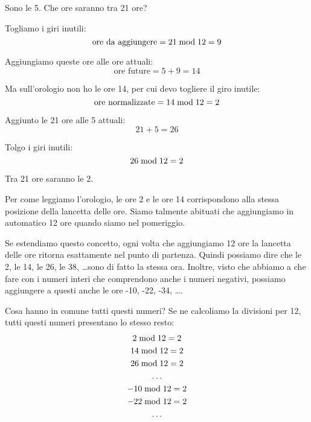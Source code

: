 \begin{esercizio}
    Sono le 5.
    Che ore saranno tra 21 ore?


    Togliamo i giri inutili:
    \begin{equation*}
        \text{ore da aggiungere} = 21  \bmod  12 = 9
    \end{equation*}

    Aggiungiamo queste ore alle ore attuali:
    \begin{equation*}
        \text{ore future} = 5 + 9 = 14
    \end{equation*}

    Ma sull'orologio non ho le ore 14, per cui devo togliere il giro inutile:
    \begin{equation*}
        \text{ore normalizzate} = 14  \bmod  12 = 2
    \end{equation*}


    Aggiunto le 21 ore alle 5 attuali:
    \begin{equation*}
        21 + 5 = 26
    \end{equation*}

    Tolgo i giri inutili:
    \begin{equation*}
        26  \bmod  12 = 2
    \end{equation*}

    Tra 21 ore saranno le 2.
\end{esercizio}

Per come leggiamo l'orologio, le ore 2 e le ore 14 corrispondono alla stessa posizione della lancetta delle ore.
Siamo talmente abituati che aggiungiamo in automatico 12 ore quando siamo nel pomeriggio.

Se estendiamo questo concetto, ogni volta che aggiungiamo 12 ore la lancetta delle ore ritorna esattamente nel punto di partenza.
Quindi possiamo dire che le 2, le 14, le 26, le 38, \dots sono di fatto la stessa ora.
Inoltre, visto che abbiamo a che fare con i numeri interi che comprendono anche i numeri negativi, possiamo aggiungere a questi anche le ore -10, -22, -34, \dots.

Cosa hanno in comune tutti questi numeri?
Se ne calcoliamo la divisioni per 12, tutti questi numeri presentano lo stesso resto:
\begin{gather*}
    2  \bmod  12 = 2 \\
    14  \bmod  12 = 2 \\
    26  \bmod  12 = 2 \\
    \dots \\
    -10  \bmod  12 = 2 \\
    -22  \bmod  12 = 2 \\
    \dots
\end{gather*}

